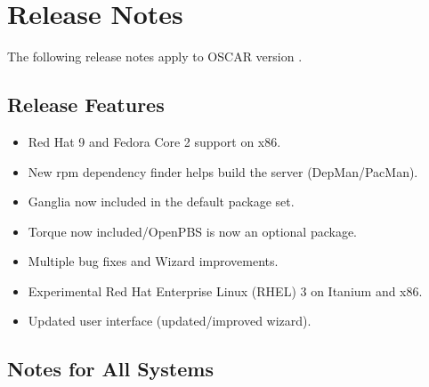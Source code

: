 %
% 
%
%

\section{Release Notes}
\label{sec:release-notes}

The following release notes apply to OSCAR version \oscarversion.
\subsection{Release Features}
\label{subsec:release-features}

\begin{itemize}

\item Red Hat 9 and Fedora Core 2 support on x86.
\item New rpm dependency finder helps build the server (DepMan/PacMan).
\item Ganglia now included in the default package set.
\item Torque now included/OpenPBS is now an optional package.
\item Multiple bug fixes and Wizard improvements.
\item Experimental Red Hat Enterprise Linux (RHEL) 3 on Itanium and x86.
\item Updated user interface (updated/improved wizard). 

\end{itemize}

\subsection{Notes for All Systems}
\label{subsec:release-notes}

